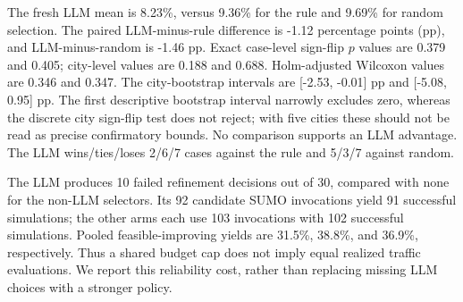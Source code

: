 The fresh LLM mean is 8.23\%, versus 9.36\% for the rule and 9.69\% for random selection. The paired LLM-minus-rule difference is -1.12 percentage points (pp), and LLM-minus-random is -1.46 pp. Exact case-level sign-flip $p$ values are 0.379 and 0.405; city-level values are 0.188 and 0.688. Holm-adjusted Wilcoxon values are 0.346 and 0.347. The city-bootstrap intervals are [-2.53, -0.01] pp and [-5.08, 0.95] pp. The first descriptive bootstrap interval narrowly excludes zero, whereas the discrete city sign-flip test does not reject; with five cities these should not be read as precise confirmatory bounds. No comparison supports an LLM advantage. The LLM wins/ties/loses 2/6/7 cases against the rule and 5/3/7 against random.

The LLM produces 10 failed refinement decisions out of 30, compared with none for the non-LLM selectors. Its 92 candidate SUMO invocations yield 91 successful simulations; the other arms each use 103 invocations with 102 successful simulations. Pooled feasible-improving yields are 31.5\%, 38.8\%, and 36.9\%, respectively. Thus a shared budget cap does not imply equal realized traffic evaluations. We report this reliability cost, rather than replacing missing LLM choices with a stronger policy.
